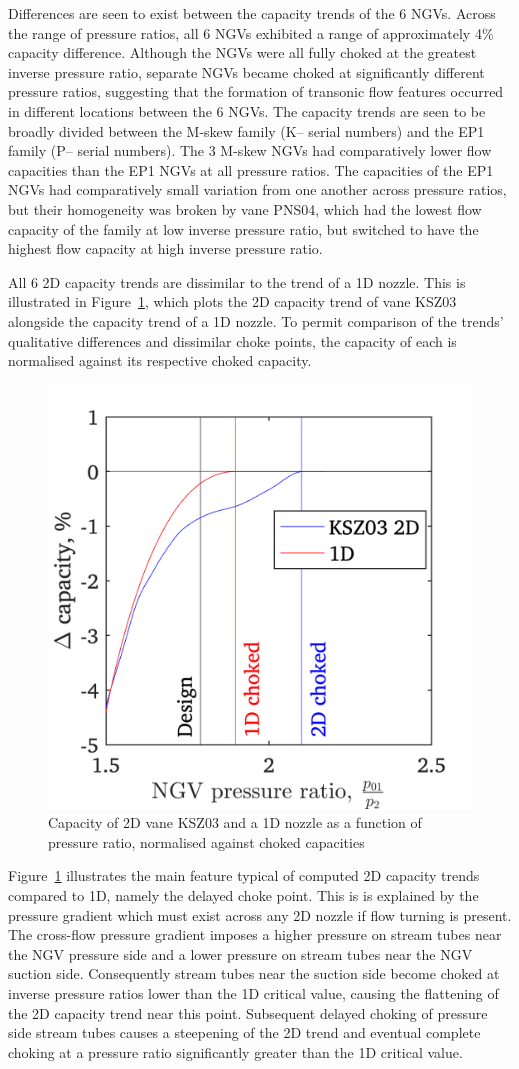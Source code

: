 \documentclass[a4paper, 11pt, oneside]{report}
\begin{document}
Differences are seen to exist between the capacity trends of the 6 NGVs. Across the range of pressure ratios, all 6 NGVs exhibited a range of approximately 4\% capacity difference. Although the NGVs were all fully choked at the greatest inverse pressure ratio, separate NGVs became choked at significantly different pressure ratios, suggesting that the formation of transonic flow features occurred in different locations between the 6 NGVs. The capacity trends are seen to be broadly divided between the M-skew family (K-- serial numbers) and the EP1 family (P-- serial numbers). The 3 M-skew NGVs had comparatively lower flow capacities than the EP1 NGVs at all pressure ratios. The capacities of the EP1 NGVs had comparatively small variation from one another across pressure ratios, but their homogeneity was broken by vane PNS04, which had the lowest flow capacity of the family at low inverse pressure ratio, but switched to have the highest flow capacity at high inverse pressure ratio.

All 6 2D capacity trends are dissimilar to the trend of a 1D nozzle. This is illustrated in Figure~\ref{fig:t900_1d_vs_2d_capacity_trends}, which plots the 2D capacity trend of vane KSZ03 alongside the capacity trend of a 1D nozzle. To permit comparison of the trends' qualitative differences and dissimilar choke points, the capacity of each is normalised against its respective choked capacity.

\begin{figure}[H]
	\centering
	\includegraphics[width=.45\textwidth]{figs/t900_1d_vs_2d_capacity_trends.png}
	\caption{Capacity of 2D vane KSZ03 and a 1D nozzle as a function of pressure ratio, normalised against choked capacities}
    \label{fig:t900_1d_vs_2d_capacity_trends}
\end{figure}

Figure~\ref{fig:t900_1d_vs_2d_capacity_trends} illustrates the main feature typical of computed 2D capacity trends compared to 1D, namely the delayed choke point. This is is explained by the pressure gradient which must exist across any 2D nozzle if flow turning is present. The cross-flow pressure gradient imposes a higher pressure on stream tubes near the NGV pressure side and a lower pressure on stream tubes near the NGV suction side. Consequently stream tubes near the suction side become choked at inverse pressure ratios lower than the 1D critical value, causing the flattening of the 2D capacity trend near this point. Subsequent delayed choking of pressure side stream tubes causes a steepening of the 2D trend and eventual complete choking at a pressure ratio significantly greater than the 1D critical value.
\end{document}
